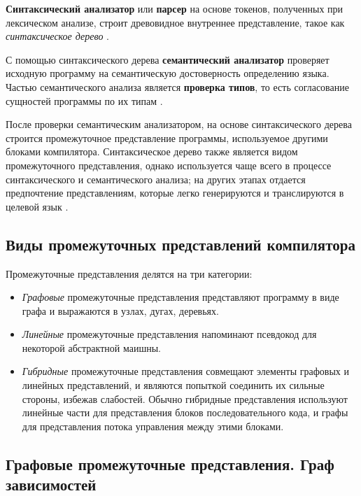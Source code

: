 \textbf{Синтаксический анализатор} или \textbf{парсер} на основе токенов,
полученных при лексическом анализе, строит древовидное внутреннее представление,
такое как \textit{синтаксическое дерево} \cite[с.~35]{dragonbook}.

С помощью синтаксического дерева \textbf{семантический анализатор} проверяет
исходную программу на семантическую достоверность определению языка. Частью
семантического анализа является \textbf{проверка типов}, то есть согласование
сущностей программы по их типам \cite[с.~37]{dragonbook}.

После проверки семантическим анализатором, на основе синтаксического
дерева строится промежуточное представление программы, используемое другими
блоками компилятора. Синтаксическое дерево также является видом промежуточного
представления, однако используется чаще всего в процессе синтаксического
и семантического анализа; на других этапах отдается предпочтение представлениям,
которые легко генерируются и транслируются в целевой язык \cite[с.~38]{dragonbook}.

\subsection{Виды промежуточных представлений компилятора}\label{sec:ch1/sec5/subsec3}

Промежуточные представления делятся на три категории:

\begin{itemize}
    \item \textit{Графовые} промежуточные представления
    представляют программу в виде графа и выражаются в
    узлах, дугах, деревьях.
    \item \textit{Линейные} промежуточные представления
    напоминают псевдокод для некоторой абстрактной маишны.
    \item \textit{Гибридные} промежуточные представления
    совмещают элементы графовых и линейных представлений,
    и являются попыткой соединить их сильные стороны, избежав
    слабостей. Обычно гибридные представления используют
    линейные части для представления блоков последовательного
    кода, и графы для представления потока управления между
    этими блоками. \cite[с.~223]{engineeringacompiler}
\end{itemize}

\subsection{Графовые промежуточные представления. Граф зависимостей}\label{sec:ch1/sec5/subsec4}

